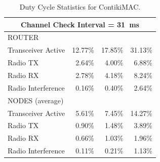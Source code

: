 \documentclass[conference]{IEEEtran}
\begin{document}
\begin{table}
\begin{tabular}{|l|r|r|r|}
\multicolumn{4}{|c|}{Channel Check Interval = 31~ms}\\
\hline
 ROUTER & \multicolumn{3}{|c|}{ }\\
\hline
Transceiver Active & 12.77\% & 17.85\% & 31.13\% \\
Radio TX           &  2.64\% &  4.00\% &  6.88\% \\
Radio RX           &  2.78\% &  4.18\% &  8.24\% \\
Radio Interference &  0.16\% &  0.40\% &  2.64\% \\
\hline
 NODES (average) & \multicolumn{3}{|c|}{ }\\
\hline
Transceiver Active & 5.61\% & 7.45\% & 14.27\% \\
Radio TX           & 0.90\% & 1.48\% &  3.89\% \\
Radio RX           & 0.66\% & 1.03\% &  1.96\% \\
Radio Interference & 0.11\% & 0.21\% &  1.13\% \\

\hline
\end{tabular}
\caption{Duty Cycle Statistics for ContikiMAC.}
\label{TblDutyCyclesContikiMAC}
\end{table}
\end{document}
